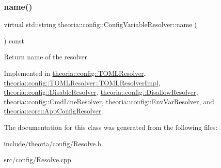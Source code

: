 \subsubsection{\texorpdfstring{name()}{name()}}
{\footnotesize\ttfamily virtual std\+::string theoria\+::config\+::\+Config\+Variable\+Resolver\+::name (\begin{DoxyParamCaption}{ }\end{DoxyParamCaption}) const\hspace{0.3cm}{\ttfamily [pure virtual]}}

Return name of the resolver 

Implemented in \hyperlink{classtheoria_1_1config_1_1TOMLResolver_a6b50ff1e396f74183318915e602837fc}{theoria\+::config\+::\+T\+O\+M\+L\+Resolver}, \hyperlink{classTOMLResolver_1_1TOMLResolverImpl_a5b9f36aca6c20a81b18b078fa74c3c14}{theoria\+::config\+::\+T\+O\+M\+L\+Resolver\+::\+T\+O\+M\+L\+Resolver\+Impl}, \hyperlink{classtheoria_1_1config_1_1DisableResolver_ae7caa7a59ad2921ec2cba0544ed26ad0}{theoria\+::config\+::\+Disable\+Resolver}, \hyperlink{classtheoria_1_1config_1_1DisallowResolver_a8352df79f9e0f17fbfad8801bfdcc99e}{theoria\+::config\+::\+Disallow\+Resolver}, \hyperlink{classtheoria_1_1config_1_1CmdLineResolver_ab42f0d86e62e985ee0bc94947df46a74}{theoria\+::config\+::\+Cmd\+Line\+Resolver}, \hyperlink{classtheoria_1_1config_1_1EnvVarResolver_ab2c250e1b7866dcd618dc90f3c3eab19}{theoria\+::config\+::\+Env\+Var\+Resolver}, and \hyperlink{classtheoria_1_1core_1_1AppConfigResolver_ad7c8c08e622613c6505418774a71abda}{theoria\+::core\+::\+App\+Config\+Resolver}.



The documentation for this class was generated from the following files\+:\begin{DoxyCompactItemize}
\item 
include/theoria/config/Resolve.\+h\item 
src/config/Resolve.\+cpp\end{DoxyCompactItemize}

